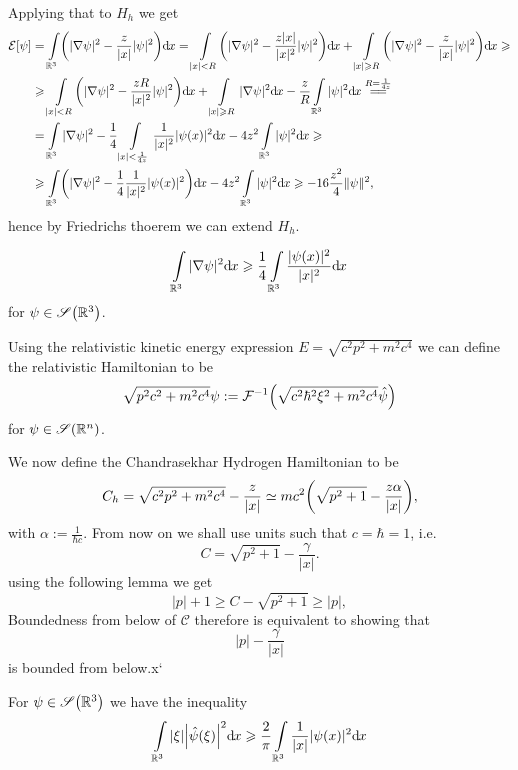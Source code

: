 \documentclass[12pt]{article}
\numberwithin{equation}{section}
\theoremstyle{plain}
\theoremstyle{plain}
\renewcommand{\d}{\mathrm{d}\hspace{-0.025cm}}
\renewcommand{\cong}{\simeq}
\begin{document}
\begin{example*}
\begin{enumerate}
	Applying that to $H_h$ we get 
	\begin{align*}
		\mathcal E[\psi] &= \int\limits_{\mathbb{R}^3} \mleft( |\nabla \psi|^2 - \frac{z}{|x|}|\psi|^2 \mright) \d x 	= \int\limits_{|x|< R } \mleft( |\nabla \psi|^2 - \frac{z |x|}{|x|^2}|\psi|^2 \mright) \d x + \int\limits_{|x|\geqslant R} \mleft( |\nabla \psi|^2 - \frac{z}{|x|}|\psi|^2 \mright) \d x \geqslant \\
		& \geqslant \int\limits_{|x|< R} \mleft( |\nabla \psi|^2 - \frac{z R}{|x|^2}|\psi|^2 \mright) \d x + \int\limits_{|x|\geqslant R} |\nabla \psi|^2 \d x - \frac{z}{R} \int\limits_{\mathbb{R}^3} |\psi|^2 \d x \stackrel{R = \frac{1}{4z}}{=\joinrel=}\\
		&= \int\limits_{\mathbb{R}^3} |\nabla \psi|^2 -  \frac{1}{4} \int\limits_{|x|< \frac{1}{4z}} \frac{1}{|x|^2} |\psi(x)|^2 \d x - 4 z^2 \int\limits_{\mathbb{R}^3} |\psi|^2 \d x \geqslant \\
		& \geqslant \int\limits_{\mathbb{R}^3} \mleft( |\nabla \psi|^2 - \frac{1}{4}\frac{1}{|x|^2}|\psi(x)|^2 \mright) \d x - 4 z^2 \int\limits_{\mathbb{R}^3} |\psi|^2 \d x \geqslant -16 \frac{z^2}{4} \|\psi\|^2,
	\end{align*}
	hence by Friedrichs thoerem we can extend $H_h$.
	
\end{enumerate}
\end{example*}

\begin{lemma}
	\[
		\int\limits_{\mathbb{R}^3} |\nabla\psi|^2 \d x \geqslant \frac{1}{4} \int\limits_{\mathbb{R}^3} \frac{|\psi(x)|^2}{|x|^2} \d x 	
	\]
	for $\psi \in \mathscr S\mleft( \mathbb{R}^3 \mright)$.
\end{lemma}

\begin{example*}
	Using the relativistic kinetic energy expression $E = \sqrt{c^2 p^2 + m^2 c^4}$ we can define the relativistic Hamiltonian to be 
	\[
		\sqrt{p^2c^2 + m^2c^4} \psi := \mathcal F^{-1} \mleft( \sqrt{c^2 \hbar^2 \xi^2 + m^2c^4} \hat\psi \mright)	
	\]
	for $\psi \in \mathscr S \mleft( \mathbb{R}^n \mright)$.
	
	We now define the Chandrasekhar Hydrogen Hamiltonian to be 
	\[
		C_h = \sqrt{c^2 p^2 + m^2 c^4} - \frac{z}{|x|} \cong m c^2 \mleft( \sqrt{p^2 +1} - \frac{z \alpha}{|x|} \mright),	
	\]
	with $\alpha:= \frac{1}{\hbar c}$. From now on we shall use units such that $c = \hbar = 1$, i.e.
	\[
		C= \sqrt{p^2 +1} - \frac{\gamma}{|x|}.
	\]
	using the following lemma we get 
	\[
		|p| +1 \geqslant C - \sqrt{p^2 +1} \geqslant |p|,	
	\]
	Boundedness from below of $\mathscr C$ therefore is equivalent to showing that 
	\[
		|p| - \frac{\gamma}{|x|}	
	\]
	is bounded from below.x`
\end{example*}

\begin{lemma}
For $\psi \in \mathscr S \mleft( \mathbb{R}^3 \mright)$ we have the inequality 
\[
	\int\limits_{\mathbb{R}^3} |\xi| \mleft| \hat\psi(\xi) \mright|^2 \d x \geqslant \frac{2}{\pi} \int\limits_{\mathbb{R}^3} \frac{1}{|x|}|\psi(x)|^2 \d x
\]
\end{lemma}
\end{document}

